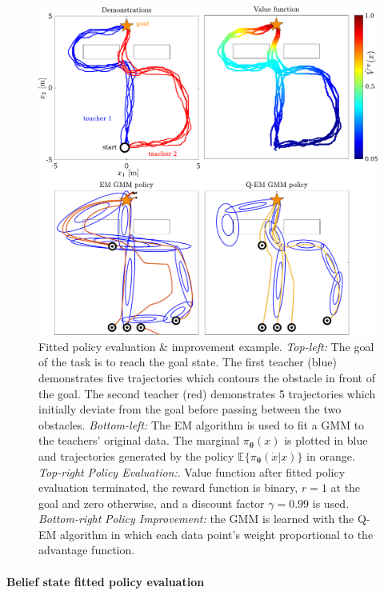 \documentclass[final,3p,times,twocolumn]{elsarticle}
\newcommand{\X}{x}
\newcommand{\U}{\dot{x}}
\newcommand{\Param}{\boldsymbol{\theta}}
\begin{document}
\begin{figure}
 \centering
 \setlength\fboxsep{0pt}
  \setlength\fboxrule{0.25pt}
  \includegraphics[width=\linewidth]{./Figure/fpe_example.pdf}
 \caption{Fitted policy evaluation \& improvement example. 
  \textit{Top-left:} The goal of the task is to reach the goal state. The first teacher (blue) demonstrates 
  five trajectories which contours the obstacle in front of the goal. The second teacher (red) demonstrates 
  5 trajectories which initially deviate from the goal before passing between the two obstacles. 
  \textit{Bottom-left:} The EM algorithm is used to fit a GMM to the teachers' original data. 
  The marginal $\pi_{\Param}(\X)$ is plotted in blue and trajectories generated by the 
  policy $\mathbb{E}\{\pi_{\Param}(\U|\X)\}$ in orange. \textit{Top-right} \textit{Policy Evaluation:}.  
  Value function after fitted policy evaluation terminated, the reward function 
  is binary, $r=1$ at the goal and zero otherwise, and a discount factor $\gamma = 0.99$ is used.
  \textit{Bottom-right} \textit{Policy Improvement:} the GMM is learned with the Q-EM algorithm in which 
  each data point's weight proportional to the advantage function.
 }
  \label{fig:fpe_example}
\end{figure}

\paragraph{Belief state fitted policy evaluation}
\end{document}
